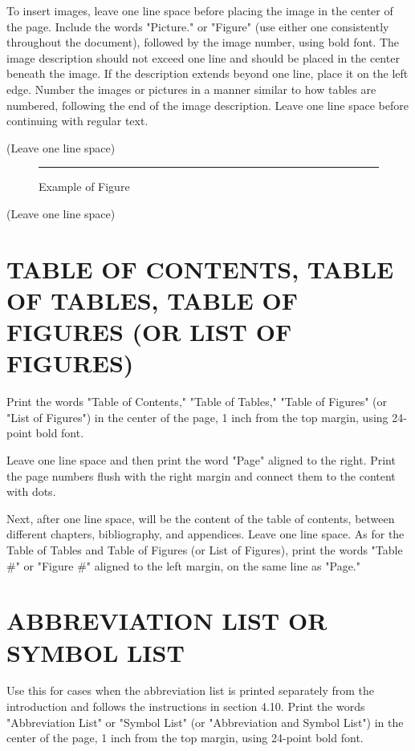 To insert images, leave one line space before placing the image in the center of the page. Include the words "Picture." or "Figure" (use either one consistently throughout the document), followed by the image number, using bold font. The image description should not exceed one line and should be placed in the center beneath the image. If the description extends beyond one line, place it on the left edge. Number the images or pictures in a manner similar to how tables are numbered, following the end of the image description. Leave one line space before continuing with regular text.

(Leave one line space)

\begin{figure}[h]
\centering
\rule{6cm}{4cm} %
\caption{Example of Figure}
\label{fig:3.1}
\end{figure}

(Leave one line space)

\section{TABLE OF CONTENTS, TABLE OF TABLES, TABLE OF FIGURES (OR LIST OF FIGURES)}

Print the words "Table of Contents," "Table of Tables," "Table of Figures" (or "List of Figures") in the center of the page, 1 inch from the top margin, using 24-point bold font.

Leave one line space and then print the word "Page" aligned to the right. Print the page numbers flush with the right margin and connect them to the content with dots.

Next, after one line space, will be the content of the table of contents, between different chapters, bibliography, and appendices. Leave one line space. As for the Table of Tables and Table of Figures (or List of Figures), print the words "Table \#" or "Figure \#" aligned to the left margin, on the same line as "Page."

\section{ABBREVIATION LIST OR SYMBOL LIST}

Use this for cases when the abbreviation list is printed separately from the introduction and follows the instructions in section 4.10. Print the words "Abbreviation List" or "Symbol List" (or "Abbreviation and Symbol List") in the center of the page, 1 inch from the top margin, using 24-point bold font.

